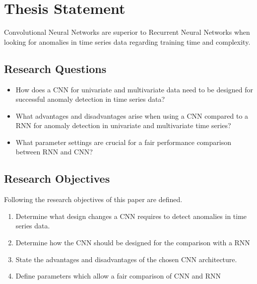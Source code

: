 
\section{Thesis Statement} \label{thesisstatement}

Convolutional Neural Networks are superior to Recurrent Neural Networks when looking for anomalies in time series data regarding training time and complexity.

\subsection{Research Questions} \label{research_questions}

\begin{itemize}
	\item How does a CNN for univariate and multivariate data need to be designed for successful anomaly detection in time series data?
	\item What advantages and disadvantages arise when using a CNN compared to a RNN for anomaly detection in univariate and multivariate time series?
	\item What parameter settings are crucial for a fair performance comparison between RNN and CNN? 
\end{itemize}

 
\subsection{Research Objectives}

Following the research objectives of this paper are defined.


\begin{enumerate}
	\item Determine what design changes a CNN requires to detect anomalies in time series data.
	\item Determine how the CNN should be designed for the comparison with a RNN
	\item State the advantages and disadvantages of the chosen CNN architecture.
	\item Define parameters which allow a fair comparison of CNN and RNN
\end{enumerate}

